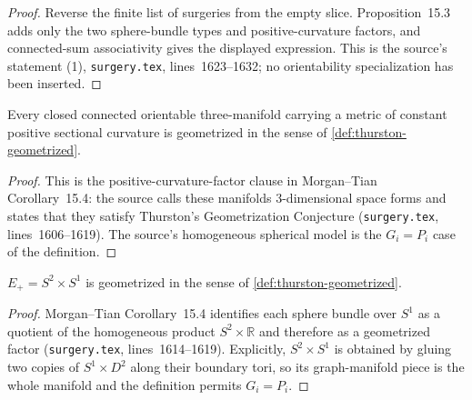 \begin{proof}
Reverse the finite list of surgeries from the empty slice.  Proposition~15.3
adds only the two sphere-bundle types and positive-curvature factors, and
connected-sum associativity gives the displayed expression.  This is the
source's statement (1), \texttt{surgery.tex}, lines~1623--1632; no
orientability specialization has been inserted.
\end{proof}

\begin{lemma}
\label{lem:positive-space-form-geometrized}
\notready
Every closed connected orientable three-manifold carrying a metric of constant
positive sectional curvature is geometrized in the sense of
\ref{def:thurston-geometrized}.
\end{lemma}

\begin{proof}
This is the positive-curvature-factor clause in Morgan--Tian Corollary~15.4:
the source calls these manifolds $3$-dimensional space forms and states that
they satisfy Thurston's Geometrization Conjecture
(\texttt{surgery.tex}, lines~1606--1619).  The source's homogeneous spherical
model is the $G_i=P_i$ case of the definition.
\end{proof}

\begin{lemma}
\label{lem:orientable-sphere-bundle-geometrized}
\notready
$E_+=S^2\times S^1$ is geometrized in the sense of
\ref{def:thurston-geometrized}.
\end{lemma}

\begin{proof}
Morgan--Tian Corollary~15.4 identifies each sphere bundle over $S^1$ as a
quotient of the homogeneous product $S^2\times\mathbb R$ and therefore as a
geometrized factor (\texttt{surgery.tex}, lines~1614--1619).  Explicitly,
$S^2\times S^1$ is obtained by gluing two copies of $S^1\times D^2$ along
their boundary tori, so its graph-manifold piece is the whole manifold and
the definition permits $G_i=P_i$.
\end{proof}

